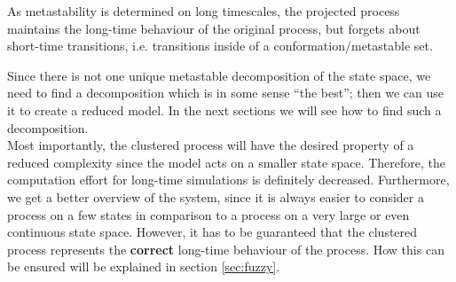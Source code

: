 
As metastability is determined on
long timescales, the projected process maintains the long-time behaviour of the original process, but forgets about short-time transitions, i.e. transitions inside of a conformation/metastable set.

Since there is not one unique metastable decomposition of the state space, we need to find a decomposition which is in some sense ``the best''; then we can use it to create a reduced model. In the next sections we will see how to find such a decomposition.
\\




Most importantly, the clustered process will have the desired property of a reduced complexity since the model acts on a smaller state space.
Therefore, the computation effort for long-time simulations is definitely decreased.
Furthermore, we get a better overview of the system, since it is always easier to consider a process on a few states in comparison to a process on a very large or even continuous state space.
However, it has to be guaranteed that the clustered process represents the \textbf{correct} long-time behaviour of the process. How this can be ensured will be explained in section \ref{sec:fuzzy}.
\clearpage